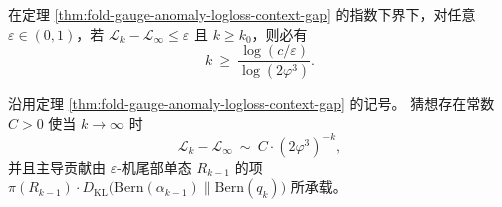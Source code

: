 \begin{corollary}[达到指定误差阈值所需的上下文深度]\label{cor:fold-gauge-anomaly-logloss-context-depth}
在定理 \ref{thm:fold-gauge-anomaly-logloss-context-gap} 的指数下界下，对任意 \(\varepsilon\in(0,1)\)，若 \(\mathcal L_k-\mathcal L_\infty\le \varepsilon\) 且 \(k\ge k_0\)，则必有
\[
k\ \ge\ \frac{\log(c/\varepsilon)}{\log(2\varphi^3)}.
\]
\end{corollary}

\begin{conjecture}[对数损失缺口的精确指数率与主导项]\label{conj:fold-gauge-anomaly-logloss-gap-asymptotic}
沿用定理 \ref{thm:fold-gauge-anomaly-logloss-context-gap} 的记号。
猜想存在常数 \(C>0\) 使当 \(k\to\infty\) 时
\[
\mathcal L_k-\mathcal L_\infty\ \sim\ C\cdot (2\varphi^3)^{-k},
\]
并且主导贡献由 \(\varepsilon\)-机尾部单态 \(R_{k-1}\) 的项
\(
\pi(R_{k-1})\cdot D_{\mathrm{KL}}\bigl(\mathrm{Bern}(\alpha_{k-1})\|\mathrm{Bern}(q_k)\bigr)
\)
所承载。
\end{conjecture}

\endinput
